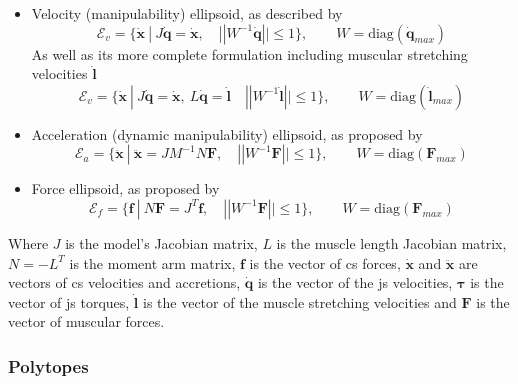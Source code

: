 \begin{itemize}
\itemindent=-13pt
\item Velocity (manipulability) ellipsoid, as described by \cite{yoshikawa_manipulability_1985}
\begin{equation}\label{eq:ev_dq_h}
\mathcal{E}_v = \{\dot{\bm{x}}~ |~ J\dot{\bm{q}} = \dot{\bm{x}}, \quad ||W^{-1}\dot{\bm{q}}|| \leq 1\}, \qquad W = \text{diag}(\dot{\bm{q}}_{max})
\end{equation}
\hspace{-13pt}
As well as its more complete formulation including muscular stretching velocities $\dot{\bm{l}}$
\begin{equation}\label{eq:ev_h}
\mathcal{E}_v = \{\dot{\bm{x}}~ |~ J\dot{\bm{q}} = \dot{\bm{x}},~ L\dot{\bm{q}} = \dot{\bm{l}} \quad ||W^{-1}\dot{\bm{l}}|| \leq 1\}, \qquad W = \text{diag}(\dot{\bm{l}}_{max})
\end{equation}

\item Acceleration (dynamic manipulability) ellipsoid, as proposed by \citet{khatib2009robotics}
\begin{equation}\label{eq:ea_r}
\mathcal{E}_{a} = \{\ddot{\bm{x}}~ |~ \ddot{\bm{x}} = JM^{-1}N\bm{F}, \quad ||W^{-1}\bm{F}|| \leq 1\}, \qquad W = \text{diag}(\bm{F}_{max})
\end{equation}

\item Force ellipsoid, as proposed by \citet{petric2019assistive}
\begin{equation}\label{eq:ef_r}
\mathcal{E}_{f} = \{\bm{f}~ |~ N\bm{F}  = J^T\bm{f},\quad ||W^{-1}\bm{F}|| \leq 1\}, \qquad W = \text{diag}(\bm{F}_{max})
\end{equation}
\end{itemize}
Where $J$ is the model's Jacobian matrix, $L$ is the muscle length Jacobian matrix, $N= -L^T$ is the moment arm matrix, $\bm{f}$ is the vector of \gls{cs} forces, $\dot{\bm{x}}$ and $\ddot{\bm{x}}$ are vectors of \gls{cs} velocities and accretions, $\dot{\bm{q}}$ is the vector of the \gls{js} velocities, $\bm{\tau}$ is the vector of \gls{js} torques, $\dot{\bm{l}}$ is the vector of the muscle stretching velocities and $\bm{F}$ is the vector of muscular forces. 

\subsubsection*{Polytopes}

